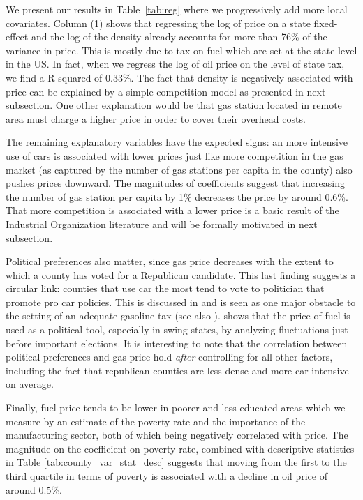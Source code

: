 \documentclass[10pt]{article}
\begin{document}
We present our results in Table~\ref{tab:reg} where we progressively add more local covariates. Column (1) shows that regressing the log of price on a state fixed-effect and the log of the density already accounts for more than 76\% of the variance in price. This is mostly due to tax on fuel which are set at the state level in the US. In fact, when we regress the log of oil price on the level of state tax, we find a R-squared of 0.33\%. The fact that density is negatively associated with price can be explained by a simple competition model as presented in next subsection. One other explanation would be that gas station located in remote area must charge a higher price in order to cover their overhead costs.

The remaining explanatory variables have the expected signs: an more intensive use of cars is associated with lower prices just like more competition in the gas market (as captured by the number of gas stations per capita in the county) also pushes prices downward. The magnitudes of coefficients suggest that increasing the number of gas station per capita by 1\% decreases the price by around 0.6\%. That more competition is associated with a lower price is a basic result of the Industrial Organization literature and will be formally motivated in next subsection. 

Political preferences also matter, since gas price decreases with the extent to which a county has voted for a Republican candidate. This last finding suggests a circular link: counties that use car the most tend to vote to politician that promote pro car policies. This is discussed in \citet{hammar2004political} and is seen as one major obstacle to the setting of an adequate gasoline tax (see also \citealp{parry2005does}). \citet{Zitzewitz2013} shows that the price of fuel is used as a political tool, especially in swing states, by analyzing fluctuations just before important elections. It is interesting to note that the correlation between political preferences and gas price hold \emph{after} controlling for all other factors, including the fact that republican counties are less dense and more car intensive on average.

Finally, fuel price tends to be lower in poorer and less educated areas which we measure by an estimate of the poverty rate and the importance of the manufacturing sector, both of which being negatively correlated with price. The magnitude on the coefficient on poverty rate, combined with descriptive statistics in Table \ref{tab:county_var_stat_desc} suggests that moving from the first to the third quartile in terms of poverty is associated with a decline in oil price of around 0.5\%. 
\end{document}
